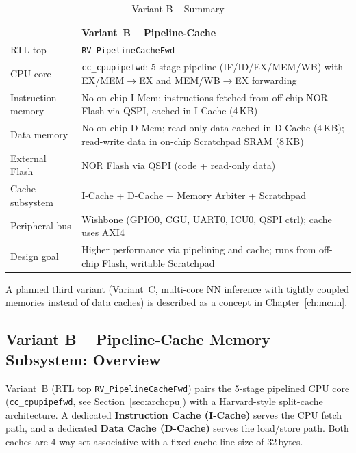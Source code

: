 \begin{table}[H]
\caption{Variant B -- Summary}
\label{tab:asChipVariants}
\centering
\begin{tabularx}{\textwidth}{|l |X|}
  \hline
   & \textbf{Variant~B -- Pipeline-Cache} \\
  \hline
  \hline
  RTL top & \texttt{RV\_PipelineCacheFwd} \\
  \hline
  CPU core & \texttt{cc\_cpupipefwd}: 5-stage pipeline (IF/ID/EX/MEM/WB) with EX/MEM$\to$EX and MEM/WB$\to$EX forwarding \\
  \hline
  Instruction memory & No on-chip I-Mem; instructions fetched from off-chip NOR Flash via QSPI, cached in I-Cache (4\,KB) \\
  \hline
  Data memory & No on-chip D-Mem; read-only data cached in D-Cache (4\,KB); read-write data in on-chip Scratchpad SRAM (8\,KB) \\
  \hline
  External Flash & NOR Flash via QSPI (code + read-only data) \\
  \hline
  Cache subsystem & I-Cache + D-Cache + Memory Arbiter + Scratchpad \\
  \hline
  Peripheral bus & Wishbone (GPIO0, CGU, UART0, ICU0, QSPI ctrl); cache uses AXI4 \\
  \hline
  Design goal & Higher performance via pipelining and cache; runs from off-chip Flash, writable Scratchpad \\
  \hline
\end{tabularx}
\end{table}

\noindent
A planned third variant (Variant~C, multi-core NN inference with
tightly coupled memories instead of data caches) is described as a
concept in Chapter~\ref{ch:mcnn}.

\subsection{Variant B -- Pipeline-Cache Memory Subsystem: Overview}
\label{subsec:memCacheOverview}

Variant~B (RTL top \texttt{RV\_PipelineCacheFwd}) pairs the 5-stage
pipelined CPU core (\texttt{cc\_cpupipefwd}, see
Section~\ref{sec:archcpu}) with a Harvard-style split-cache architecture.
A dedicated \textbf{Instruction Cache (I-Cache)} serves the CPU fetch path,
and a dedicated \textbf{Data Cache (D-Cache)} serves the load/store path.
Both caches are 4-way set-associative with a fixed cache-line size of
32\,bytes.

